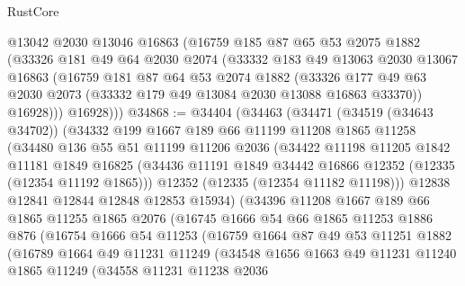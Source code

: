 \begin{lexlean}{RustCore}
\begin{coremodule}
        @13042
        @2030
        @13046
        @16863
        (@16759
          @185
          @87
          @65
          @53
          @2075
          @1882
          (@33326
            @181
            @49
            @64
            @2030
            @2074
            (@33332
              @183
              @49
              @13063
              @2030
              @13067
              @16863
              (@16759
                @181
                @87
                @64
                @53
                @2074
                @1882
                (@33326
                  @177
                  @49
                  @63
                  @2030
                  @2073
                  (@33332 @179 @49 @13084 @2030 @13088 @16863 @33370))
                @16928)))
          @16928)))
@34868 := @34404
    (@34463
      (@34471
        (@34519 (@34643 @34702))
        (@34332
          @199
          @1667
          @189
          @66
          @11199
          @11208
          @1865
          @11258
          (@34480
            @136
            @55
            @51
            @11199
            @11206
            @2036
            (@34422
              @11198
              @11205
              @1842
              @11181
              @1849
              @16825
              (@34436 @11191 @1849 @34442 @16866 @12352 (@12335 (@12354 @11192 @1865)))
              @12352
              (@12335 (@12354 @11182 @11198)))
            @12838
            @12841
            @12844
            @12848
            @12853
            @15934)
          (@34396
            @11208
            @1667
            @189
            @66
            @1865
            @11255
            @1865
            @2076
            (@16745
              @1666
              @54
              @66
              @1865
              @11253
              @1886
              @876
              (@16754
                @1666
                @54
                @11253
                (@16759
                  @1664
                  @87
                  @49
                  @53
                  @11251
                  @1882
                  (@16789
                    @1664
                    @49
                    @11231
                    @11249
                    (@34548
                      @1656
                      @1663
                      @49
                      @11231
                      @11240
                      @1865
                      @11249
                      (@34558
                        @11231
                        @11238
                        @2036

\end{coremodule}
\end{lexlean}
